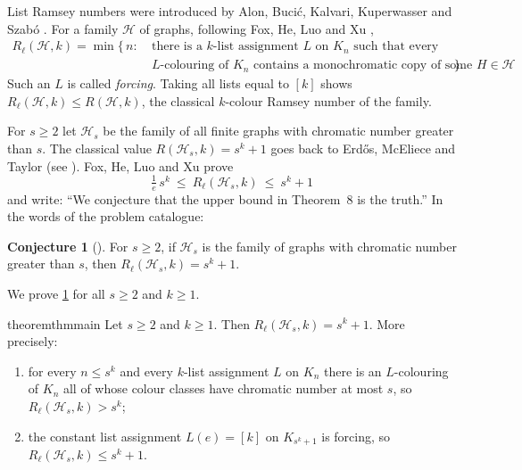\documentclass[11pt,a4paper]{article}
\theoremstyle{plain}
\theoremstyle{definition}
\newtheorem{conjecture}[theorem]{Conjecture}
\theoremstyle{remark}
\newcommand{\cH}{\mathcal H}
\newcommand{\Rl}{R_{\ell}}
\begin{document}
List Ramsey numbers were introduced by Alon, Bucić, Kalvari, Kuperwasser and Szabó \cite{ABKKS21}. For a family $\cH$ of graphs, following Fox, He, Luo and Xu \cite[Section~3.1]{FHLX21},
\begin{align*}
 \Rl(\cH,k)=\min\bigl\{\,n:\ &\text{there is a $k$-list assignment $L$ on $K_n$ such that every}\\
 &\text{$L$-colouring of $K_n$ contains a monochromatic copy of some $H\in\cH$}\,\bigr\}.
\end{align*}
Such an $L$ is called \emph{forcing}. Taking all lists equal to $[k]$ shows $\Rl(\cH,k)\le R(\cH,k)$, the classical $k$-colour Ramsey number of the family.

For $s\ge2$ let $\cH_s$ be the family of all finite graphs with chromatic number greater than $s$. The classical value $R(\cH_s,k)=s^k+1$ goes back to Erdős, McEliece and Taylor (see \cite{FHLX21}). Fox, He, Luo and Xu prove \cite[Theorem~8]{FHLX21}
\[
 \tfrac1e\,s^k\ \le\ \Rl(\cH_s,k)\ \le\ s^k+1
\]
and write: ``We conjecture that the upper bound in Theorem~8 is the truth.'' In the words of the problem catalogue:

\begin{conjecture}[{\cite[Section~3.1]{FHLX21}}]\label{conj}
For $s\ge2$, if $\cH_s$ is the family of graphs with chromatic number greater than $s$, then $\Rl(\cH_s,k)=s^k+1$.
\end{conjecture}

We prove \cref{conj} for all $s\ge2$ and $k\ge1$.

\begin{restatable}{theorem}{thmmain}\label{thm:main}
Let $s\ge2$ and $k\ge1$. Then $\Rl(\cH_s,k)=s^k+1$. More precisely:
\begin{enumerate}[label=(\roman*),nosep]
\item for every $n\le s^k$ and every $k$-list assignment $L$ on $K_n$ there is an $L$-colouring of $K_n$ all of whose colour classes have chromatic number at most $s$, so $\Rl(\cH_s,k)>s^k$;
\item the constant list assignment $L(e)=[k]$ on $K_{s^k+1}$ is forcing, so $\Rl(\cH_s,k)\le s^k+1$.
\end{enumerate}
\end{restatable}
\end{document}
